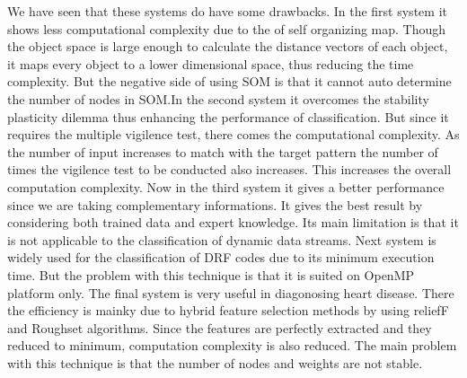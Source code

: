 \documentclass[10pt,a4paper,journal]{IEEEtran}
\begin{document}
\hspace{1cm}We have seen that these systems do have some drawbacks. In the first system\cite{1} it shows less computational complexity due to the of self organizing map. Though the object space is large enough to calculate the distance vectors of each object, it maps every object to a lower dimensional space, thus reducing the time complexity. But the negative side of using SOM is that it cannot auto determine the number of nodes in SOM.In the second system\cite{4} it overcomes the stability plasticity dilemma thus enhancing the performance of classification. But since it requires the multiple vigilence test, there comes the computational complexity. As the number of input increases to match with the target pattern the number of times the vigilence test to be conducted also increases. This increases the overall computation complexity. Now in the third system\cite{7} it gives a better performance since we are taking complementary informations. It gives the best result by considering both trained data and expert knowledge. Its main limitation is that it is not applicable to the classification of dynamic data streams.
Next system\cite{9} is widely used for the classification of DRF codes due to its minimum execution time. But the problem with this technique is that it is suited on OpenMP platform only.
The final system\cite{12} is very useful in diagonosing heart disease. There the efficiency is mainky due to hybrid feature selection methods by using reliefF and Roughset algorithms. Since the features are perfectly extracted and they reduced to minimum, computation complexity is also reduced. The main problem with this technique is that the number of nodes and weights\cite{15} are not stable.\\
\end{document}
